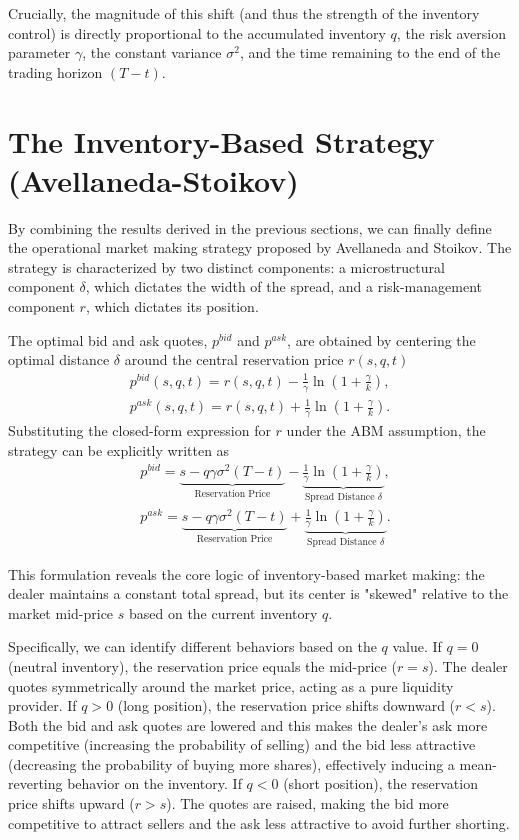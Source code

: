 \documentclass[a4paper,10pt,titlepage,oneside,openany]{book}
\theoremstyle{plain}\newtheorem{theorem}{Theorem}[chapter]
\theoremstyle{definition}\newtheorem{definition}{Definition}[chapter]
\theoremstyle{remark}\newtheorem{remark}{Remark}[chapter]
\begin{document}
Crucially, the magnitude of this shift (and thus the strength of the inventory control) is directly proportional to the accumulated inventory $q$, the risk aversion parameter $\gamma$, the constant variance $\sigma^2$, and the time remaining to the end of the trading horizon $(T-t)$.

\section{The Inventory-Based Strategy (Avellaneda-Stoikov)}
By combining the results derived in the previous sections, we can finally define the operational market making strategy proposed by Avellaneda and Stoikov. The strategy is characterized by two distinct components: a microstructural component $\delta$, which dictates the width of the spread, and a risk-management component $r$, which dictates its position.

The optimal bid and ask quotes, $p^{bid}$ and $p^{ask}$, are obtained by centering the optimal distance $\delta$ around the central reservation price $r(s,q,t)$
\begin{align*}
    p^{bid}(s,q,t) = r(s,q,t) - \frac{1}{\gamma} \ln \left( 1 + \frac{\gamma}{k} \right),\\
    p^{ask}(s,q,t) = r(s,q,t) + \frac{1}{\gamma} \ln \left( 1 + \frac{\gamma}{k} \right).
\end{align*}
Substituting the closed-form expression for $r$ under the ABM assumption, the strategy can be explicitly written as
\begin{align*}
    &p^{bid} = \underbrace{s - q\gamma\sigma^2(T-t)}_{\text{Reservation Price}} - \underbrace{\frac{1}{\gamma} \ln \left( 1 + \frac{\gamma}{k} \right)}_{\text{Spread Distance } \delta},\\
    &p^{ask} = \underbrace{s - q\gamma\sigma^2(T-t)}_{\text{Reservation Price}} + \underbrace{\frac{1}{\gamma} \ln \left( 1 + \frac{\gamma}{k} \right)}_{\text{Spread Distance } \delta}.
\end{align*}

This formulation reveals the core logic of inventory-based market making: the dealer maintains a constant total spread, but its center is "skewed" relative to the market mid-price $s$ based on the current inventory $q$. 

Specifically, we can identify different behaviors based on the $q$ value. If $q=0$ (neutral inventory), the reservation price equals the mid-price ($r=s$). The dealer quotes symmetrically around the market price, acting as a pure liquidity provider. If $q>0$ (long position), the reservation price shifts downward ($r < s$). Both the bid and ask quotes are lowered and this makes the dealer's ask more competitive (increasing the probability of selling) and the bid less attractive (decreasing the probability of buying more shares), effectively inducing a mean-reverting behavior on the inventory. If $q<0$ (short position), the reservation price shifts upward ($r > s$). The quotes are raised, making the bid more competitive to attract sellers and the ask less attractive to avoid further shorting.
\end{document}
